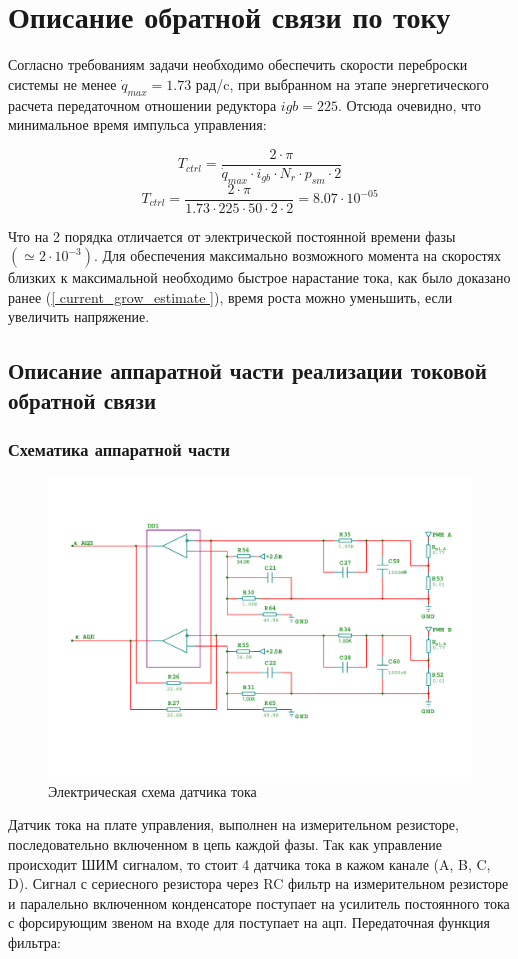\newpage
\section{ Описание обратной связи по току }
Согласно требованиям задачи необходимо обеспечить скорости переброски системы не менее 
$ \dot{q}_{max} = 1.73$ рад/c, при выбранном на этапе энергетического расчета передаточном
отношении редуктора $ i{gb} = 225 $. Отсюда очевидно, что минимальное время импульса управления:

$$
    T_{ctrl} = \frac{ 2 \cdot \pi }{ \dot{q}_{max} \cdot i_{gb} \cdot N_{r} \cdot p_{sm} \cdot 2 }
$$
$$
    T_{ctrl} = \frac{ 2 \cdot \pi }{ 1.73 \cdot 225 \cdot 50 \cdot 2 \cdot 2 } = 8.07 \cdot 10^{-05}
$$

Что на 2 порядка отличается от электрической постоянной времени фазы $( \simeq2 \cdot 10^{-3} )$.
Для обеспечения максимально возможного момента на скоростях близких к максимальной необходимо
быстрое нарастание тока, как было доказано ранее (\ref{ current_grow_estimate }), время роста можно
уменьшить, если увеличить напряжение.

\subsection{ Описание аппаратной части реализации токовой обратной связи }

\subsubsection{ Схематика аппаратной части }

\begin{figure}
\centering
\includegraphics[width=121mm, keepaspectratio]{./src/pictures/current_measuring_sheme}
\caption{Электрическая схема датчика тока}
\label{graph_speed_and_angle_comutation}
\end{figure}
Датчик тока на плате управления, выполнен на измерительном резисторе, последовательно
включенном в цепь каждой фазы. Так как управление происходит ШИМ сигналом, то стоит 4
датчика тока в кажом канале (A, B, C, D).
Сигнал с сериесного резистора через RC фильтр на измерительном резисторе и паралельно включенном
конденсаторе поступает на усилитель постоянного тока с форсирующим звеном на входе для поступает на ацп.
Передаточная функция фильтра:

